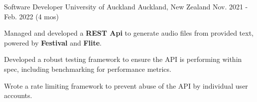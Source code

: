 \begin{cventries}
  \cventry
    {Software Developer} %
    {University of Auckland} %
    {Auckland, New Zealand} %
    {Nov. 2021 - Feb. 2022 (4 mos)} %
    {
      \begin{cvitems} %
        \item {Managed and developed a \textbf{REST Api} to generate audio files from provided text, powered by \textbf{Festival} and \textbf{Flite}.}
        \item {Developed a robust testing framework to ensure the API is performing within spec, including benchmarking for performance metrics.}
        \item {Wrote a rate limiting framework to prevent abuse of the API by individual user accounts.}
      \end{cvitems}
    }




\end{cventries}
